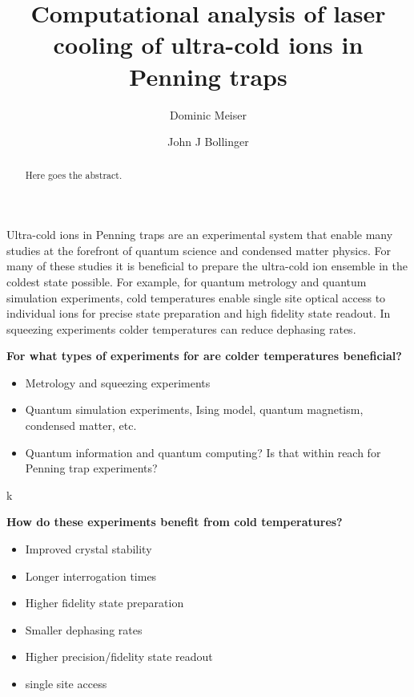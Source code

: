 \documentclass[aps, pra, preprint]{revtex4-1}
\begin{document}
\title{Computational analysis of laser cooling of ultra-cold ions
  in Penning traps
}

\author{Dominic Meiser\\
}
\author{John J Bollinger}

\begin{abstract}
  Here goes the abstract.
\end{abstract}

\maketitle


Ultra-cold ions in Penning traps are an experimental system that
enable many studies at the forefront of quantum science and
condensed matter physics. For many of these studies it is
beneficial to prepare the ultra-cold ion ensemble in the coldest
state possible. For example, for quantum
metrology and quantum simulation
experiments, cold temperatures enable single
site optical access to individual ions for precise state
preparation and high fidelity state readout. In squeezing
experiments colder temperatures can reduce dephasing rates.

{\bf For what types of experiments for are colder temperatures
beneficial?}
\begin{itemize}
\item Metrology and squeezing experiments
\item Quantum simulation experiments, Ising
  model\cite{Britton:EngineeredIsingModel}, quantum magnetism,
  condensed matter, etc.
\item Quantum information and quantum computing? Is that within
  reach for Penning trap experiments?
\end{itemize}k

{\bf How do these experiments benefit from cold temperatures?}
\begin{itemize}
\item Improved crystal stability
\item Longer interrogation times
\item Higher fidelity state preparation
\item Smaller dephasing rates
\item Higher precision/fidelity state readout
\item single site access
\end{itemize}
\end{document}
